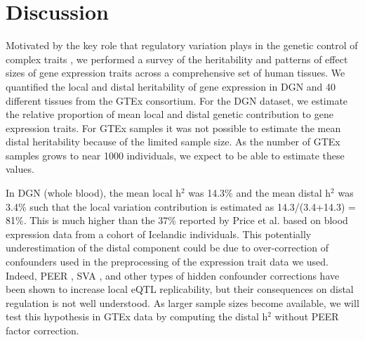 \documentclass[10pt,letterpaper]{article}
\begin{document}

\section*{Discussion}
Motivated by the key role that regulatory variation plays in the genetic control of complex traits \cite{Nicolae_2010,Nica_2010,Gusev_2014}, we performed a survey of the heritability and patterns of effect sizes of gene expression traits across a comprehensive set of human tissues. We quantified the local and distal heritability of gene expression in DGN and 40 different tissues from the GTEx consortium. For the DGN dataset, we estimate the relative proportion of mean local and distal genetic contribution to gene expression traits. For GTEx samples it was not possible to estimate the mean distal heritability because of the limited sample size. As the number of GTEx samples grows to near 1000 individuals, we expect to be able to estimate these values.

In DGN (whole blood), the mean local h$^2$ was 14.3\% and the mean distal h$^2$ was 3.4\% such that the local variation contribution is estimated as 14.3/(3.4+14.3) = 81\%. This is much higher than the 37\% reported by Price et al. \cite{Price_2011} based on blood expression data from a cohort of Icelandic individuals. This potentially underestimation of the distal component could be due to over-correction of confounders used in the preprocessing of the expression trait data we used. Indeed, PEER \cite{Stegle_2012}, SVA \cite{Leek_2007}, and other types of hidden confounder corrections have been shown to increase local eQTL replicability, but their consequences on distal regulation is not well understood.  As larger sample sizes become available, we will test this hypothesis in GTEx data by computing the distal h$^2$ without PEER factor correction.

\end{document}
